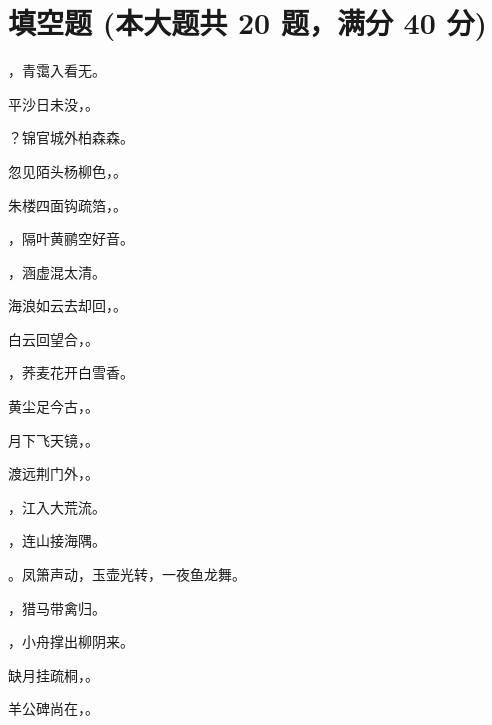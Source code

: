 \documentclass[12pt, a4paper, addpoints]{exam}
\begin{document}
\pagestyle{headandfoot}
\runningheadrule
{}

\begin{center}
\end{center}
\vspace{5mm}

\normalsize
\vspace{5mm}

\section{\normalsize{填空题 (本大题共 20 题，满分 40 分)}}
\hspace{1.5cm}
\begin{questions}
\question[2] \uline{\qquad\qquad\qquad\qquad}，青霭入看无。

\question[2] 平沙日未没，\uline{\qquad\qquad\qquad\qquad}。

\question[2] \uline{\qquad\qquad\qquad\qquad}？锦官城外柏森森。

\question[2] 忽见陌头杨柳色，\uline{\qquad\qquad\qquad\qquad}。

\question[2] 朱楼四面钩疏箔，\uline{\qquad\qquad\qquad\qquad}。

\question[2] \uline{\qquad\qquad\qquad\qquad}，隔叶黄鹂空好音。

\question[2] \uline{\qquad\qquad\qquad\qquad}，涵虚混太清。

\question[2] 海浪如云去却回，\uline{\qquad\qquad\qquad\qquad}。

\question[2] 白云回望合，\uline{\qquad\qquad\qquad\qquad}。

\question[2] \uline{\qquad\qquad\qquad\qquad}，荞麦花开白雪香。

\question[2] 黄尘足今古，\uline{\qquad\qquad\qquad\qquad}。

\question[2] 月下飞天镜，\uline{\qquad\qquad\qquad\qquad}。

\question[2] 渡远荆门外，\uline{\qquad\qquad\qquad\qquad}。

\question[2] \uline{\qquad\qquad\qquad\qquad}，江入大荒流。

\question[2] \uline{\qquad\qquad\qquad\qquad}，连山接海隅。

\question[2] \uline{\qquad\qquad\qquad\qquad}。凤箫声动，玉壶光转，一夜鱼龙舞。

\question[2] \uline{\qquad\qquad\qquad\qquad}，猎马带禽归。

\question[2] \uline{\qquad\qquad\qquad\qquad}，小舟撑出柳阴来。

\question[2] 缺月挂疏桐，\uline{\qquad\qquad\qquad\qquad}。

\question[2] 羊公碑尚在，\uline{\qquad\qquad\qquad\qquad}。

\end{questions}
\end{document}

